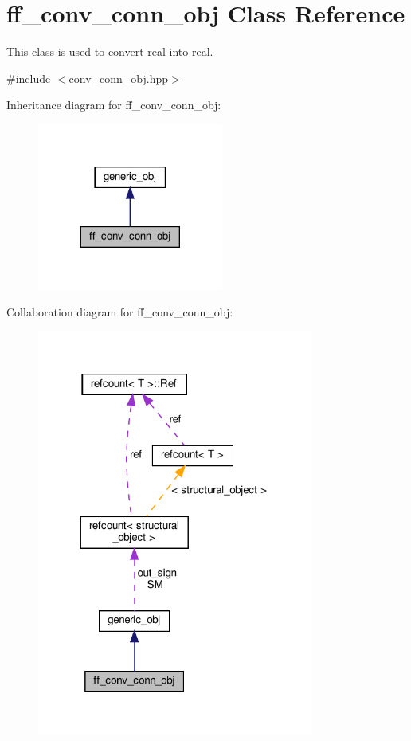 \hypertarget{classff__conv__conn__obj}{}\section{ff\+\_\+conv\+\_\+conn\+\_\+obj Class Reference}
\label{classff__conv__conn__obj}


This class is used to convert real into real.  




{\ttfamily \#include $<$conv\+\_\+conn\+\_\+obj.\+hpp$>$}



Inheritance diagram for ff\+\_\+conv\+\_\+conn\+\_\+obj\+:
\nopagebreak
\begin{figure}[H]
\begin{center}
\leavevmode
\includegraphics[width=173pt]{d6/d4e/classff__conv__conn__obj__inherit__graph}
\end{center}
\end{figure}


Collaboration diagram for ff\+\_\+conv\+\_\+conn\+\_\+obj\+:
\nopagebreak
\begin{figure}[H]
\begin{center}
\leavevmode
\includegraphics[width=257pt]{d5/de8/classff__conv__conn__obj__coll__graph}
\end{center}
\end{figure}
